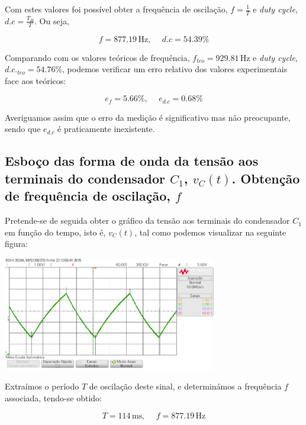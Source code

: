 \documentclass[a4paper,11pt]{report}
\begin{document}
Com estes valores foi possível obter a frequência de oscilação, $f=\frac{1}{T}$ e \textit{duty cycle}, $d.c=\frac{T_H}{T}$. Ou seja,

$$f=877.19\,\textrm{Hz},\hspace{15pt} d.c=54.39\%$$

Comparando com os valores teóricos de frequência, $f_{teo}=929.81\,\textrm{Hz}$ e \textit{duty cycle}, $d.c._{teo}=54.76\%$, podemos verificar um erro relativo dos valores experimentais face aos teóricos:

$$e_{f}=5.66\%, \hspace{15pt} e_{d.c}=0.68\%$$

Averiguamos assim que o erro da medição é significativo mas não preocupante, sendo que $e_{d.c}$ é praticamente inexistente.\\

\subsection{Esboço das forma de onda da tensão aos terminais do condensador $C_1$, $v_C(t)$. Obtenção de frequência de oscilação, $f$}

Pretende-se de seguida obter o gráfico da tensão aos terminais do condensador $C_1$ em função do tempo, isto é, $v_C(t)$, tal como podemos visualizar na seguinte figura:

\begin{center}
    \includegraphics[angle=0,width=0.7\textwidth]{VC.png}
    \label{fig:VC}
    \end{center}

Extraímos o período $T$ de oscilação deste sinal, e determinámos a frequência $f$ associada, tendo-se obtido:

$$T=114\,\textrm{ms},\hspace{15pt}f=877.19\,\textrm{Hz}$$
\end{document}
